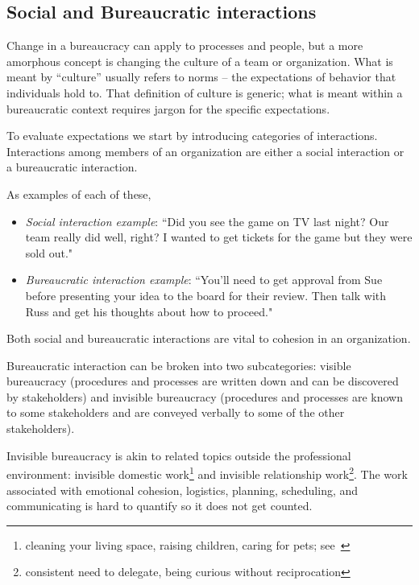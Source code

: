 
\subsection*{Social and Bureaucratic interactions\label{sec:socializing}}

Change in a bureaucracy can apply to processes and people, but a more amorphous concept is changing the culture of a team or organization. What is meant by ``culture'' usually refers to norms -- the expectations of behavior that individuals hold to. That definition of culture is generic; what is meant within a bureaucratic context requires jargon for the specific expectations.

To evaluate expectations we start by introducing categories of interactions. 
Interactions among members of an organization are either a social interaction or a bureaucratic interaction. 

As examples of each of these,
\begin{itemize}
\item \textit{Social interaction example}: ``Did you see the game on TV last night? Our team really did well, right? I wanted to get tickets for the game but they were sold out."
\item \textit{Bureaucratic interaction example}: ``You'll need to get approval from Sue before presenting your idea to the board for their review. Then talk with Russ and get his thoughts about how to proceed."
\end{itemize}
Both social and bureaucratic interactions are vital to cohesion in an organization. 


Bureaucratic interaction can be broken into two subcategories: 
\gls{visible bureaucracy} 
\marginpar{[Glossary]}
(procedures and processes are written down and can be discovered by stakeholders) and 
\gls{invisible bureaucracy} 
\marginpar{[Glossary]}
(procedures and processes are known to some stakeholders and are conveyed verbally to some of the other stakeholders).

Invisible bureaucracy is akin to related topics outside the professional environment: invisible domestic work\footnote{cleaning your living space, raising children, caring for pets; see~\cite{1987_Daniels}} and invisible relationship work\footnote{consistent need to delegate, being curious without reciprocation}. The work associated with emotional cohesion, logistics, planning, scheduling, and communicating is hard to quantify so it does not get counted.


